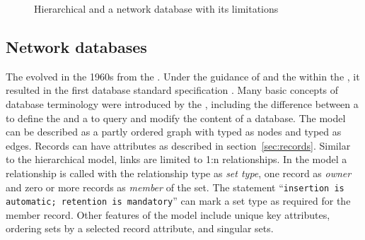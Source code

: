 \begin{figure}
\caption{Hierarchical and a network database with its limitations}
\label{fig:hnetexamples}
\end{figure}

\subsection{Network databases}
\label{sec:networkdatamodel}

The  evolved in the 1960s from the
 . Under the guidance of
 and the 
within the , 
it resulted in the first database standard specification
\cite{CODASYL1971,CODASYL1978}. Many basic concepts of database
terminology were introduced by the , including the 
difference between a  to
define the  and a  to query and modify the content of a database. The 
 model can be described as a partly ordered graph with typed
 as nodes and typed
 as edges. Records can have attributes
as described in section~\ref{sec:records}. Similar to the hierarchical model,
links are limited to 1:n relationships. In the  model a
relationship is called  with the
relationship type as \textit{set type}, one record as \textit{owner} and zero
or more records as \textit{member} of the set. The  statement
``\texttt{insertion is automatic; retention is mandatory}'' can mark a set type as
required for the member record. Other features of the  model include
unique key attributes, ordering sets by a selected record attribute, and
singular sets. 

